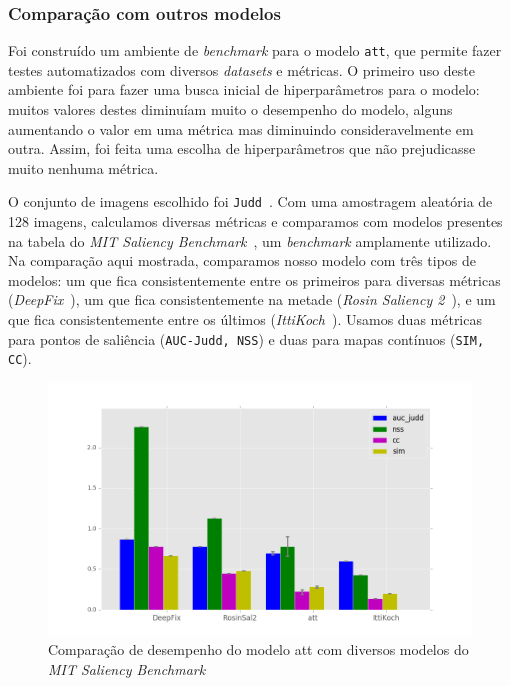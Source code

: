 \documentclass[article]{IEEEtran}
\newcommand{\tit}[1]{\textit{#1}}
\newcommand{\ttt}[1]{\texttt{#1}}
\begin{document}
\subsubsection{Comparação com outros modelos}
Foi construído um ambiente de \tit{benchmark} para o modelo \ttt{att},
que permite fazer testes automatizados com diversos \tit{datasets} e métricas.
O primeiro uso deste ambiente foi para fazer uma busca inicial de
hiperparâmetros para o modelo: muitos valores destes diminuíam muito o
desempenho do modelo, alguns aumentando o valor em uma métrica mas
diminuindo consideravelmente em outra. Assim, foi feita uma escolha de
hiperparâmetros que não prejudicasse muito nenhuma métrica.

O conjunto de imagens escolhido foi \ttt{Judd}~\cite{juddBM}.
Com uma amostragem aleatória de 128 imagens, calculamos diversas métricas
e comparamos com modelos presentes na tabela do
\tit{MIT Saliency Benchmark}~\cite{mitsal}, um \tit{benchmark}
amplamente utilizado.
Na comparação aqui mostrada, comparamos nosso modelo com três tipos de
modelos: um que fica consistentemente entre os primeiros para diversas
métricas (\tit{DeepFix}~\cite{DeepFix}), um que fica consistentemente na metade
(\tit{Rosin Saliency 2}~\cite{rosinsal2}),
e um que fica consistentemente entre os últimos (\tit{IttiKoch}~\cite{itti}).
Usamos duas métricas para pontos de saliência (\ttt{AUC-Judd, NSS}) e duas para
mapas contínuos (\ttt{SIM, CC}).
\begin{figure}[H]
    \includegraphics[width=1.1\linewidth]{img/comp.png}
\caption{Comparação de desempenho do modelo att com diversos modelos
do \tit{MIT Saliency Benchmark}}
\label{fig:comp}
\end{figure}
\end{document}
